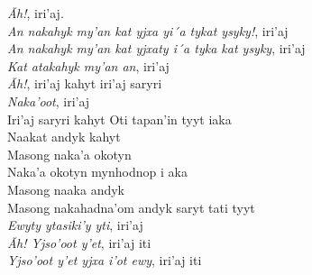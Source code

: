 \bigskip

\begin{linenumbers}\begingroup\raggedright
\noindent \emph{Ãh!}, iri'aj.\\
\emph{An nakahyk my'an kat yjxa yi´a tykat ysyky!}, iri'aj\\
\emph{An nakahyk my'an kat yjxaty i´a tyka kat ysyky}, iri'aj\\
\emph{Kat atakahyk my'an an}, iri'aj\\
\emph{Ãh!}, iri'aj kahyt iri'aj saryri\\
\emph{Naka'oot}, iri'aj\\
Iri'aj saryri kahyt Oti tapan'in tyyt iaka\\
Naakat andyk kahyt\\
Masong naka'a okotyn\\
Naka'a okotyn mynhodnop i aka\\
Masong naaka andyk\\
Masong nakahadna'om andyk saryt tati tyyt\\
\emph{Ewyty ytasiki'y yti}, iri'aj\\
\emph{Ãh! Yjso'oot y'et}, iri'aj iti\\
\emph{Yjso'oot y'et yjxa i'ot ewy}, iri'aj iti\\

\end{linenumbers}
